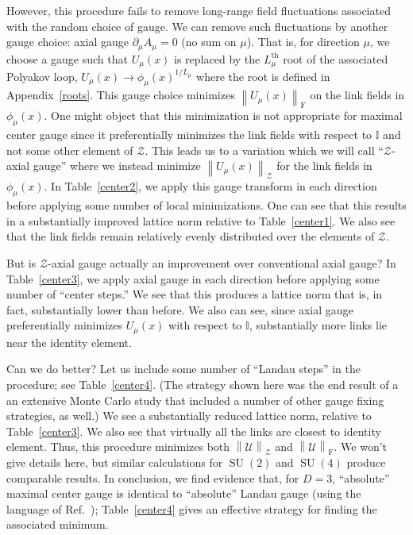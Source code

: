 \documentclass[preprint,aps,prd]{revtex4-2}
\newcommand{\zentrum}{\mathcal{Z}}       %
\newcommand{\config}{\mathcal{U}}
\DeclareMathOperator{\SU}{SU}
\newcommand\fnorm[1]{\left\lVert #1 \right\rVert_\mathrm{F}}
\begin{document}
However, this procedure fails to remove long-range field fluctuations
associated with the random choice of gauge.  We can remove
such fluctuations by another gauge choice:  axial gauge
$\partial_\mu A_\mu = 0$ (no sum on $\mu$).
That is, for direction $\mu$, we choose a gauge such that $U_\mu(x)$
is replaced by the $L_\mu^\mathrm{th}$ root of the associated Polyakov loop,
$U_\mu(x) \to \phi_\mu(x)^{1/L_\mu}$ where the root is defined in
Appendix~\ref{roots}.
This gauge choice minimizes $\fnorm{U_\mu(x)}$
on the link fields in $\phi_\mu(x)$.  One might
object that this minimization is not appropriate for maximal center gauge
since it preferentially minimizes the link fields
with respect to $\mathbb{I}$ and not some other element of $\zentrum$.
This leads us to a variation which we will call ``$\zentrum$-axial gauge''
where we instead minimize $\left\lVert U_\mu(x) \right\rVert_\zentrum$
for the link fields in $\phi_\mu(x)$.  In Table~\ref{center2},
we apply this gauge transform in each direction before applying
some number of local minimizations.  One can see that this
results in a substantially improved lattice norm relative to
Table~\ref{center1}.  We also see that the link fields
remain relatively evenly distributed over the elements of $\zentrum$.

But is $\zentrum$-axial gauge actually an improvement over
conventional axial gauge?
In Table~\ref{center3}, we apply axial gauge in each
direction before applying some number of ``center steps.''
We see that this produces a lattice norm that is, in fact,
substantially lower than before.  We also can see, since
axial gauge preferentially minimizes $U_\mu(x)$ with
respect to $\mathbb{I}$, substantially more links lie near
the identity element.

Can we do better? Let us include some number of ``Landau steps''
in the procedure; see Table~\ref{center4}.  (The strategy shown
here was the end result of a an extensive Monte Carlo study that
included a number of other gauge fixing strategies, as well.)
We see a substantially reduced lattice norm, relative to
Table~\ref{center3}.  We also see that virtually all the
links are closest to identity element.  Thus, this procedure
minimizes both $\left\lVert \config\right\rVert_\zentrum$ and
$\fnorm{\config}$.
We won't give details here, but similar calculations for
$\SU(2)$ and $\SU(4)$ produce comparable results.
In conclusion, we find evidence that, for $D=3$,
``absolute'' maximal center gauge is identical to ``absolute''
Landau gauge (using the language of Ref.~\cite{maas_more_2009});
Table~\ref{center4} gives
an effective strategy for finding the associated minimum.
\end{document}
